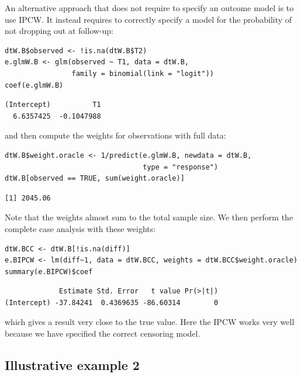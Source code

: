 \documentclass[12pt]{article}
\begin{document}
\bigskip

An alternative approach that does not require to specify an outcome
model is to use IPCW. It instead requires to correctly specify a model
for the probability of not dropping out at follow-up:
\lstset{language=r,label= ,caption= ,captionpos=b,numbers=none}
\begin{lstlisting}
dtW.B$observed <- !is.na(dtW.B$T2)
e.glmW.B <- glm(observed ~ T1, data = dtW.B,
                family = binomial(link = "logit"))
coef(e.glmW.B)
\end{lstlisting}

\begin{verbatim}
(Intercept)          T1 
  6.6357425  -0.1047988
\end{verbatim}


and then compute the weights for observations with full data:
\lstset{language=r,label= ,caption= ,captionpos=b,numbers=none}
\begin{lstlisting}
dtW.B$weight.oracle <- 1/predict(e.glmW.B, newdata = dtW.B,
                                 type = "response")
dtW.B[observed == TRUE, sum(weight.oracle)]
\end{lstlisting}

\begin{verbatim}
[1] 2045.06
\end{verbatim}


Note that the weights almost sum to the total sample size. We then
perform the complete case analysis with these weights:
\lstset{language=r,label= ,caption= ,captionpos=b,numbers=none}
\begin{lstlisting}
dtW.BCC <- dtW.B[!is.na(diff)]
e.BIPCW <- lm(diff~1, data = dtW.BCC, weights = dtW.BCC$weight.oracle)
summary(e.BIPCW)$coef
\end{lstlisting}

\begin{verbatim}
             Estimate Std. Error   t value Pr(>|t|)
(Intercept) -37.84241  0.4369635 -86.60314        0
\end{verbatim}


which gives a result very close to the true value. Here the IPCW works
very well because we have specified the correct censoring model.

\clearpage

\subsection{Illustrative example 2}
\label{sec:orgf578993}
\end{document}
